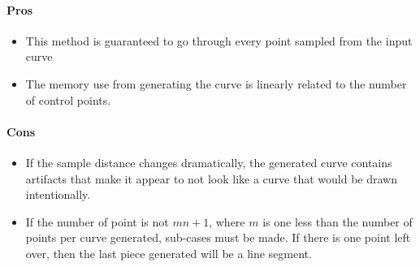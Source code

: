 \documentclass[12pt]{report}
\begin{document}
\paragraph{Pros}

\begin{itemize}
\item This method is guaranteed to go through every point sampled from the input curve
\item The memory use from generating the curve is linearly related to the number of control points.
\end{itemize}

\paragraph{Cons}
\begin{itemize}
\item If the sample distance changes dramatically, the generated curve contains artifacts that make it appear to not look like a curve that would be drawn intentionally.
\item If the number of point is not $mn + 1$, where $m$ is one less than the number of points per curve generated, sub-cases must be made. If there is one point left over, then the last piece generated will be a line segment.
\end{itemize}
\end{document}
